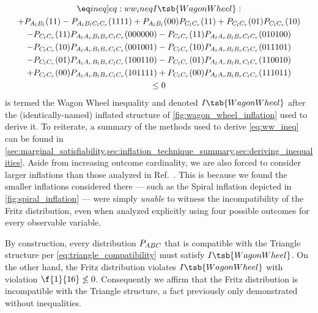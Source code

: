 \documentclass[aps, 10pt, english, twoside, pra, nofootinbib, tightenlines, longbibliography, superscriptaddress]{revtex4-1}
\begin{document}
    \begin{equation*}
    \begin{gathered}
        \eq\label[ineq]{eq:ww_ineq}
        I\tsb{WagonWheel} : \\
        +P_{A_{l}B_{l}}(11) -P_{A_{l}B_{l}C_{l}C_{r}}(1111) +P_{A_{l}B_{l}}(00) P_{C_{l}C_{r}}(11) +P_{C_{l}C_{r}}(01) P_{C_{l}C_{r}}(10) \\
        -P_{C_{l}C_{r}}(11) P_{A_{l}A_{r}B_{l}B_{r}C_{l}C_{r}}(000000) -P_{C_{l}C_{r}}(11) P_{A_{l}A_{r}B_{l}B_{r}C_{l}C_{r}}(010100) \\
        -P_{C_{l}C_{r}}(10) P_{A_{l}A_{r}B_{l}B_{r}C_{l}C_{r}}(001001) -P_{C_{l}C_{r}}(10) P_{A_{l}A_{r}B_{l}B_{r}C_{l}C_{r}}(011101) \\
        -P_{C_{l}C_{r}}(01) P_{A_{l}A_{r}B_{l}B_{r}C_{l}C_{r}}(100110) -P_{C_{l}C_{r}}(01) P_{A_{l}A_{r}B_{l}B_{r}C_{l}C_{r}}(110010) \\
        +P_{C_{l}C_{r}}(00) P_{A_{l}A_{r}B_{l}B_{r}C_{l}C_{r}}(101111) +P_{C_{l}C_{r}}(00) P_{A_{l}A_{r}B_{l}B_{r}C_{l}C_{r}}(111011) \\
        \leq 0
    \end{gathered}
    \end{equation*}
     is termed the Wagon Wheel inequality and denoted $I\tsb{WagonWheel}$ after the (identically-named) inflated structure of \cref{fig:wagon_wheel_inflation} used to derive it. To reiterate, a summary of the methods used to derive \cref{eq:ww_ineq} can be found in \cref{sec:marginal_satisfiability,sec:inflation_technique_summary,sec:deriving_inequalities}.
    Aside from increasing outcome cardinality, we are also forced to consider larger inflations than those analyzed in Ref.~\cite{Inflation}. This is because we found the smaller inflations considered there --- such as the Spiral inflation depicted in \cref{fig:spiral_inflation} --- were simply \textit{unable} to witness the incompatibility of the Fritz distribution, even when analyzed explicitly using four possible outcomes for every observable variable.

    By construction, every distribution $\prob[ABC]$ that is compatible with the Triangle structure per \cref{eq:triangle_compatibility} must satisfy $I\tsb{WagonWheel}$. On the other hand, the Fritz distribution violates $I\tsb{WagonWheel}$ with violation $\f{1}{16} \not \leq 0$. Consequently we affirm that the Fritz distribution is incompatible with the Triangle structure, a fact previously only demonstrated without inequalities.
\end{document}
